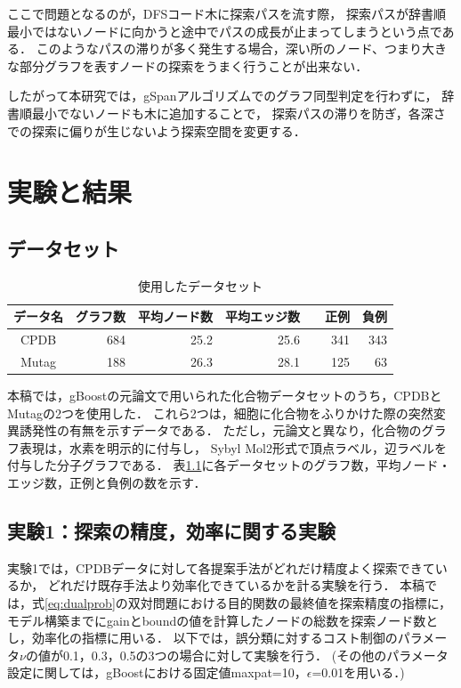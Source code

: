 ここで問題となるのが，DFSコード木に探索パスを流す際，
探索パスが辞書順最小ではないノードに向かうと途中でパスの成長が止まってしまうという点である．
このようなパスの滞りが多く発生する場合，深い所のノード、つまり大きな部分グラフを表すノードの探索をうまく行うことが出来ない．

したがって本研究では，gSpanアルゴリズムでのグラフ同型判定を行わずに，
辞書順最小でないノードも木に追加することで，
探索パスの滞りを防ぎ，各深さでの探索に偏りが生じないよう探索空間を変更する．

\chapter{実験と結果}
\section{データセット}
\begin{table}[t]
	\centering
	\begin{tabular}{|c|r|r|r|r|r|}
		\hline
		データ名 & グラフ数 & 平均ノード数 & 平均エッジ数 & 正例　& 負例\\
		\hline \hline
		CPDB  & 684 & 25.2 & 25.6 & 341 & 343\\
		\hline
		Mutag & 188 & 26.3 & 28.1 & 125 & 63\\
		\hline
	\end{tabular}
	\caption{使用したデータセット}
	\label{dataset}
\end{table}

本稿では，gBoostの元論文\cite{gBoost}で用いられた化合物データセットのうち，CPDBとMutagの2つを使用した．
これら2つは，細胞に化合物をふりかけた際の突然変異誘発性の有無を示すデータである．
ただし，元論文\cite{gBoost}と異なり，化合物のグラフ表現は，水素を明示的に付与し，
Sybyl Mol2形式で頂点ラベル，辺ラベルを付与した分子グラフである．
表\ref{dataset}に各データセットのグラフ数，平均ノード・エッジ数，正例と負例の数を示す．

\section{実験1：探索の精度，効率に関する実験}
実験1では，CPDBデータに対して各提案手法がどれだけ精度よく探索できているか，
どれだけ既存手法より効率化できているかを計る実験を行う．
本稿では，式\eqref{eq:dualprob}の双対問題における目的関数の最終値を探索精度の指標に，
モデル構築までにgainとboundの値を計算したノードの総数を探索ノード数とし，効率化の指標に用いる．
以下では，誤分類に対するコスト制御のパラメータ$\nu$の値が0.1，0.3，0.5の3つの場合に対して実験を行う．
(その他のパラメータ設定に関しては，gBoostにおける固定値maxpat=10，$\epsilon$=0.01を用いる．)

